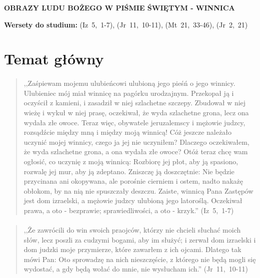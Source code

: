 \documentclass[10pt,a4paper,oneside]{article}
\begin{document}
\centerline{\textbf{\MakeUppercase{Obrazy Ludu Bożego w Piśmie Świętym - winnica}}}
\begin{center}
\textbf{Wersety do studium:} 
\mbox{(Iz 5, 1-7)}, \mbox{(Jr 11, 10-11)}, \mbox{(Mt 21, 33-46)}, \mbox{(Jr 2, 21)}
\end{center}
\section{Temat główny}
\paragraph{}
\begin{quote}
,,Zaśpiewam mojemu ulubieńcowi ulubioną jego pieśń o jego winnicy. Ulubieniec mój miał winnicę na pagórku urodzajnym. Przekopał ją i oczyścił z kamieni, i zasadził w niej szlachetne szczepy. Zbudował w niej wieżę i wykuł w niej prasę, oczekiwał, że wyda szlachetne grona, lecz ona wydała złe owoce. Teraz więc, obywatele jeruzalemscy i mężowie judzcy, rozsądźcie między mną i między moją winnicą! Cóż jeszcze należało uczynić mojej winnicy, czego ja jej nie uczyniłem? Dlaczego oczekiwałem, że wyda szlachetne grona, a ona wydała złe owoce? Otóż teraz chcę wam ogłosić, co uczynię z moją winnicą: Rozbiorę jej płot, aby ją spasiono, rozwalę jej mur, aby ją zdeptano. Zniszczę ją doszczętnie: Nie będzie przycinana ani okopywana, ale porośnie cierniem i ostem, nadto nakażę obłokom, by na nią nie spuszczały deszczu. Zaiste, winnicą Pana Zastępów jest dom izraelski, a mężowie judzcy ulubioną jego latoroślą. Oczekiwał prawa, a oto - bezprawie; sprawiedliwości, a oto - krzyk.'' \mbox{(Iz 5, 1-7)}
\end{quote}
\paragraph{}
\begin{quote}
,,Że zawrócili do win swoich praojców, którzy nie chcieli słuchać moich słów, lecz poszli za cudzymi bogami, aby im służyć; i zerwał dom izraelski i dom judzki moje przymierze, które zawarłem z ich ojcami. Dlatego tak mówi Pan: Oto sprowadzę na nich nieszczęście, z którego nie będą mogli się wydostać, a gdy będą wołać do mnie, nie wysłucham ich.'' \mbox{(Jr 11, 10-11)}
\end{quote}
\end{document}
